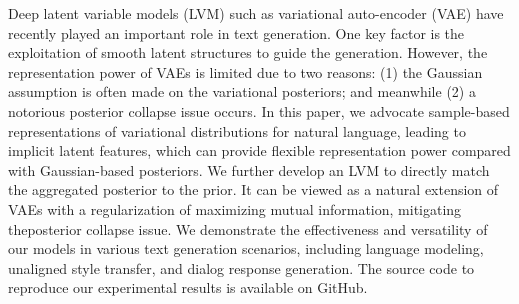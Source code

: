 Deep latent variable models (LVM) such as variational auto-encoder (VAE) have recently played an important role in text generation. One key factor is the exploitation of smooth latent structures to guide the generation. However, the representation power of VAEs is limited due to two reasons: (1) the Gaussian assumption is often made on the variational posteriors; and meanwhile (2) a notorious posterior collapse issue occurs. In this paper, we advocate sample-based representations of variational distributions for natural language, leading to implicit latent features, which can provide flexible representation power compared with Gaussian-based posteriors. We further develop an LVM to directly match the aggregated posterior to the prior. It can be viewed as a natural extension of VAEs with a regularization of maximizing mutual information, mitigating theposterior collapse issue. We demonstrate the effectiveness and versatility of our models in various text generation scenarios, including language modeling, unaligned style transfer, and dialog response generation. The source code to reproduce our experimental results is available on GitHub.
